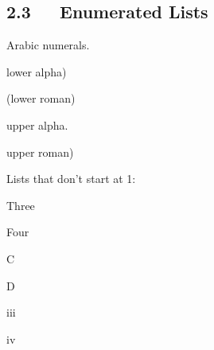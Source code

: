 \documentclass[10pt,english]{article}
\begin{document}
\subsection*{2.3~~~Enumerated Lists}
\begin{list}{.}
{
\setlength{\rightmargin}{\leftmargin}
}
\item {} 
Arabic numerals.
\begin{list}{)}
{
\setlength{\rightmargin}{\leftmargin}
}
\item {} 
lower alpha)
\begin{list}{()}
{
\setlength{\rightmargin}{\leftmargin}
}
\item {} 
(lower roman)
\begin{list}{.}
{
\setlength{\rightmargin}{\leftmargin}
}
\item {} 
upper alpha.
\begin{list}{)}
{
\setlength{\rightmargin}{\leftmargin}
}
\item {} 
upper roman)

\end{list}

\end{list}

\end{list}

\end{list}

\item {} 
Lists that don't start at 1:
\begin{list}{.}
{
\addtocounter{listcnt6}{2}
\setlength{\rightmargin}{\leftmargin}
}
\item {} 
Three

\item {} 
Four

\end{list}
\begin{list}{.}
{
\addtocounter{listcnt7}{2}
\setlength{\rightmargin}{\leftmargin}
}
\item {} 
C

\item {} 
D

\end{list}
\begin{list}{.}
{
\addtocounter{listcnt8}{2}
\setlength{\rightmargin}{\leftmargin}
}
\item {} 
iii

\item {} 
iv

\end{list}

\end{list}
\end{document}

